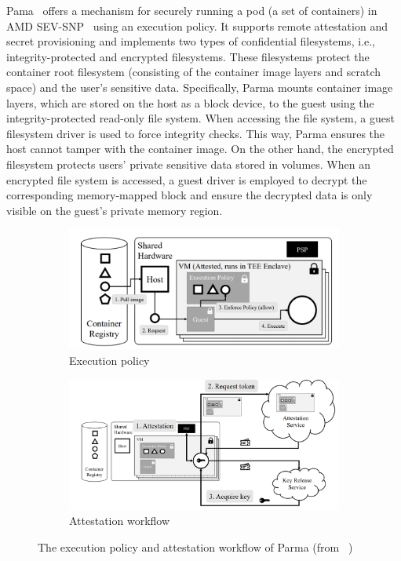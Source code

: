 Pama~\cite*{Johnson2023ParmaCC} offers a mechanism for securely running a pod (a set of containers) in AMD SEV-SNP~\cite*{SEV_SNP_white_book} using an execution policy. It supports remote attestation and secret provisioning and implements two types of confidential filesystems, i.e., 
integrity-protected and encrypted filesystems. These filesystems protect the container root filesystem (consisting of the container image layers and scratch space) and the user's sensitive data. Specifically, Parma mounts container image layers, which are stored on the host as a block device, to
the guest using the integrity-protected read-only file system. When accessing the file system, a guest filesystem driver is used to force integrity checks. This way, Parma ensures the host cannot tamper with the container image.
On the other hand, the encrypted filesystem protects users' private sensitive data stored in volumes. When an encrypted file system is accessed, a guest driver is employed to decrypt the corresponding memory-mapped block and ensure the decrypted data is only visible on the 
guest's private memory region. 
\begin{figure}[htp]
    \centering
    \begin{subfigure}[b]{0.45\textwidth}
        \centering
        \includegraphics[width=\textwidth]{images/pama_policy.png}
        \caption{Execution policy}
        \label{fig:pama_policy}
    \end{subfigure}
    \hfill
    \begin{subfigure}[b]{0.45\textwidth}
        \centering
        \includegraphics[width=\textwidth]{images/pama_atte.png}
        \caption{Attestation workflow}
        \label{fig:pama_atte}
    \end{subfigure}
    \hfill
       \caption[The execution policy and attestation workflow of Parma]{The execution policy and attestation workflow of Parma (from~\cite*{Johnson2023ParmaCC} )}
       \label{fig:pama}
\end{figure}

